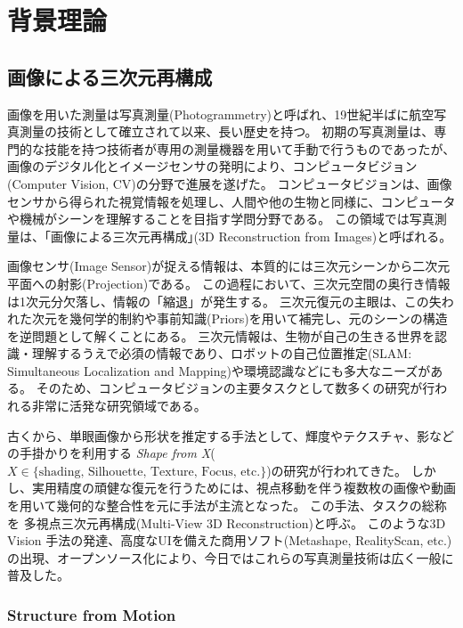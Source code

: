 \chapter{背景理論}\label{chap:prelim_3d-reconstruction-from-images}

\section{画像による三次元再構成}\label{sec:prelim_3d-reconstruction-from-images}
画像を用いた測量は写真測量(Photogrammetry)と呼ばれ、19世紀半ばに航空写真測量の技術として確立されて以来、長い歴史を持つ。
初期の写真測量は、専門的な技能を持つ技術者が専用の測量機器を用いて手動で行うものであったが、画像のデジタル化とイメージセンサの発明により、コンピュータビジョン(Computer Vision, CV)の分野で進展を遂げた。
コンピュータビジョンは、画像センサから得られた視覚情報を処理し、人間や他の生物と同様に、コンピュータや機械がシーンを理解することを目指す学問分野である。
この領域では写真測量は、｢画像による三次元再構成｣(3D Reconstruction from Images)と呼ばれる。

画像センサ(Image Sensor)が捉える情報は、本質的には三次元シーンから二次元平面への射影(Projection)である。
この過程において、三次元空間の奥行き情報は1次元分欠落し、情報の「縮退」が発生する。
三次元復元の主眼は、この失われた次元を幾何学的制約や事前知識(Priors)を用いて補完し、元のシーンの構造を逆問題として解くことにある。
三次元情報は、生物が自己の生きる世界を認識・理解するうえで必須の情報であり、ロボットの自己位置推定(SLAM: Simultaneous Localization and Mapping)や環境認識などにも多大なニーズがある。
そのため、コンピュータビジョンの主要タスクとして数多くの研究が行われる非常に活発な研究領域である。

古くから、単眼画像から形状を推定する手法として、輝度やテクスチャ、影などの手掛かりを利用する \textit{Shape from X}($X \in \{\text{shading, Silhouette, Texture, Focus, etc.}\}$)の研究が行われてきた。
しかし、実用精度の頑健な復元を行うためには、視点移動を伴う複数枚の画像や動画を用いて幾何的な整合性を元に手法が主流となった。
この手法、タスクの総称を 多視点三次元再構成(Multi-View 3D Reconstruction)と呼ぶ。
このような3D Vision 手法の発達、高度なUIを備えた商用ソフト(Metashape\cite{agisoftmetashape}, RealityScan\cite{RealityScan}, etc.)の出現、オープンソース化により、今日ではこれらの写真測量技術は広く一般に普及した\cite{Bemis2014_UAV-photogrammetry,Gomez2016_UAV-photogrammetry-disaster,Iglhaut2019_UAV-photogrammetry-forestry}。


\subsection{Structure from Motion}\label{subsec:sfm}

